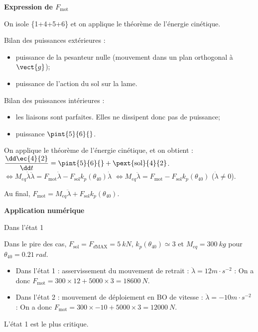 \documentclass[11pt]{article}
\begin{document}
\begin{UPSTIcorrige}

\textbf{Expression de $F_{\text{mot}}$}

On isole  \{1+4+5+6\} et on applique le théorème de l'énergie cinétique. 

Bilan des puissances extérieures : 
\begin{itemize}
\item puissance de la pesanteur nulle (mouvement dans un plan orthogonal à $\vect{g}$);
\item puissance de l'action du sol sur la lame.
\end{itemize}

Bilan des puissances intérieures :
\begin{itemize}
\item les liaisons sont parfaites. Elles ne dissipent donc pas de puissance;
\item puissance $\pint{5}{6}{}$.
\end{itemize}

On applique le théorème de l'énergie cinétique, et on obtient : 
$\dfrac{\dd \ec{4}{2}}{\dd t}= \pint{5}{6}{}+\pext{\text{sol}}{4}{2}$.
$\Leftrightarrow 
M_{eq} \dot{\lambda}\ddot{\lambda}=  F_{\text{mot}}\dot{\lambda}
-F_{\text{sol}}k_p\left(\theta_{40}\right)\dot{\lambda}$
$\Leftrightarrow 
M_{eq} \ddot{\lambda}=  F_{\text{mot}}
-F_{\text{sol}}k_p\left(\theta_{40}\right)$ ($\dot{\lambda}\neq 0$).

 Au final,   $F_{\text{mot}}=M_{eq} \ddot{\lambda} + F_{\text{sol}}k_p\left(\theta_{40}\right)$.

\textbf{Application numérique}

Dans l'état 1

Dans le pire des cas, $F_{\text{sol}} = F_{d \text{MAX}}=\SI{5}{kN}$, $k_p\left(\theta_{40}\right) \simeq 3$ et $M_{eq}=\SI{300}{kg}$ pour $\theta_{40}=\SI{0,21}{rad}$.

\begin{itemize}
\item Dans l'état 1 : asservissement du mouvement de retrait : $\ddot{\lambda}=12 m\cdot s^{-2}$ : On a donc  $F_{\text{mot}}=300 \times  12 + 5000\times 3 = \SI{18 600}{N}$.
\item Dans l'état 2 : mouvement de déploiement en BO de vitesse : $\ddot{\lambda}=-10 m\cdot s^{-2}$ : On a donc  $F_{\text{mot}}=300 \times  -10 + 5000\times 3 = \SI{12 000}{N}$.
\end{itemize}

L'état 1 est le plus critique.


\end{UPSTIcorrige}
\end{document}
